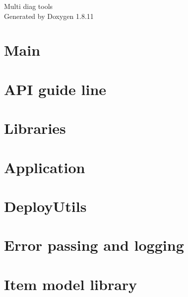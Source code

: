 \documentclass[twoside]{book}
\newcommand{\+}{\discretionary{\mbox{\scriptsize$\hookleftarrow$}}{}{}}
\newcommand{\clearemptydoublepage}{%
  \newpage{\pagestyle{empty}\cleardoublepage}%
}
\begin{document}
\hypersetup{pageanchor=false,
             bookmarksnumbered=true,
             pdfencoding=unicode
            }
\begin{titlepage}
\vspace*{7cm}
\begin{center}%
{\Large Multi diag tools }\\
\vspace*{1cm}
{\large Generated by Doxygen 1.8.11}\\
\end{center}
\end{titlepage}
\clearemptydoublepage
\tableofcontents
\clearemptydoublepage
{}
\hypersetup{pageanchor=true}

\chapter{Main}
\label{index}\hypertarget{index}{}
\chapter{A\+PI guide line}
\label{guideline_page}
\hypertarget{guideline_page}{}

\chapter{Libraries}
\label{libraries_page}
\hypertarget{libraries_page}{}

\chapter{Application}
\label{libs_Application}
\hypertarget{libs_Application}{}

\chapter{Deploy\+Utils}
\label{libs_DeployUtils}
\hypertarget{libs_DeployUtils}{}

\chapter{Error passing and logging}
\label{libs_Error}
\hypertarget{libs_Error}{}

\chapter{Item model library}
\label{libs_ItemModel}
\hypertarget{libs_ItemModel}{}

\end{document}
